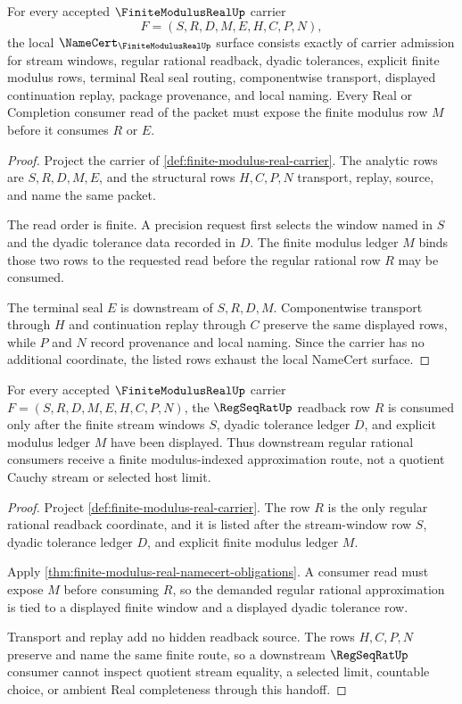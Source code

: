 \begin{theorem}
\label{thm:finite-modulus-real-namecert-obligations}
For every accepted $\FiniteModulusRealUp$ carrier
$$
F=(S,R,D,M,E,H,C,P,N),
$$
the local $\NameCert_{\FiniteModulusRealUp}$ surface consists exactly of carrier admission for stream windows, regular rational readback, dyadic tolerances, explicit finite modulus rows, terminal Real seal routing, componentwise transport, displayed continuation replay, package provenance, and local naming. Every Real or Completion consumer read of the packet must expose the finite modulus row $M$ before it consumes $R$ or $E$.
\end{theorem}
\begin{proof}
Project the carrier of \autoref{def:finite-modulus-real-carrier}. The analytic rows are $S,R,D,M,E$, and the structural rows $H,C,P,N$ transport, replay, source, and name the same packet.

The read order is finite. A precision request first selects the window named in $S$ and the dyadic tolerance data recorded in $D$. The finite modulus ledger $M$ binds those two rows to the requested read before the regular rational row $R$ may be consumed.

The terminal seal $E$ is downstream of $S,R,D,M$. Componentwise transport through $H$ and continuation replay through $C$ preserve the same displayed rows, while $P$ and $N$ record provenance and local naming. Since the carrier has no additional coordinate, the listed rows exhaust the local NameCert surface.
\end{proof}

\begin{theorem}
\label{thm:finite-modulus-real-regseqrat-handoff}
For every accepted $\FiniteModulusRealUp$ carrier $F=(S,R,D,M,E,H,C,P,N)$, the $\RegSeqRatUp$ readback row $R$ is consumed only after the finite stream windows $S$, dyadic tolerance ledger $D$, and explicit modulus ledger $M$ have been displayed. Thus downstream regular rational consumers receive a finite modulus-indexed approximation route, not a quotient Cauchy stream or selected host limit.
\end{theorem}
\begin{proof}
Project \autoref{def:finite-modulus-real-carrier}. The row $R$ is the only regular rational readback coordinate, and it is listed after the stream-window row $S$, dyadic tolerance ledger $D$, and explicit finite modulus ledger $M$.

Apply \autoref{thm:finite-modulus-real-namecert-obligations}. A consumer read must expose $M$ before consuming $R$, so the demanded regular rational approximation is tied to a displayed finite window and a displayed dyadic tolerance row.

Transport and replay add no hidden readback source. The rows $H,C,P,N$ preserve and name the same finite route, so a downstream $\RegSeqRatUp$ consumer cannot inspect quotient stream equality, a selected limit, countable choice, or ambient Real completeness through this handoff.
\end{proof}


